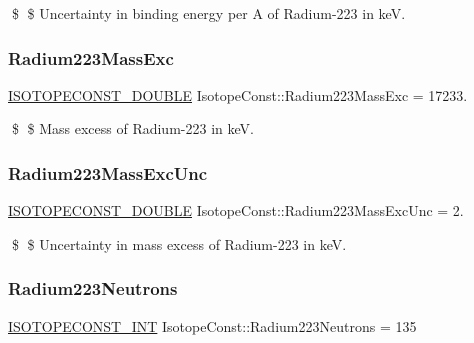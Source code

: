 \$ \$ Uncertainty in binding energy per A of Radium-\/223 in keV. \mbox{\label{group___isotope_const-_radium-_ra223_ga9c9695cea644dc98fabcd31b0465de1b}} 
\subsubsection{\texorpdfstring{Radium223\+Mass\+Exc}{Radium223MassExc}}
{\footnotesize\ttfamily \mbox{\hyperlink{group___isotope_const-_macros_ga8f45a7272ce02c0b4c65c44636ed719a}{I\+S\+O\+T\+O\+P\+E\+C\+O\+N\+S\+T\+\_\+\+D\+O\+U\+B\+LE}} Isotope\+Const\+::\+Radium223\+Mass\+Exc = 17233.}

\$ \$ Mass excess of Radium-\/223 in keV. \mbox{\label{group___isotope_const-_radium-_ra223_ga3b6c33d3b3476078f94186088eb22dcc}} 
\subsubsection{\texorpdfstring{Radium223\+Mass\+Exc\+Unc}{Radium223MassExcUnc}}
{\footnotesize\ttfamily \mbox{\hyperlink{group___isotope_const-_macros_ga8f45a7272ce02c0b4c65c44636ed719a}{I\+S\+O\+T\+O\+P\+E\+C\+O\+N\+S\+T\+\_\+\+D\+O\+U\+B\+LE}} Isotope\+Const\+::\+Radium223\+Mass\+Exc\+Unc = 2.}

\$ \$ Uncertainty in mass excess of Radium-\/223 in keV. \mbox{\label{group___isotope_const-_radium-_ra223_ga8dd10df71a4eebe7e19e72f0cf3d2bc7}} 
\subsubsection{\texorpdfstring{Radium223\+Neutrons}{Radium223Neutrons}}
{\footnotesize\ttfamily \mbox{\hyperlink{group___isotope_const-_macros_ga5f18360b3e99483a35c32d789e62621c}{I\+S\+O\+T\+O\+P\+E\+C\+O\+N\+S\+T\+\_\+\+I\+NT}} Isotope\+Const\+::\+Radium223\+Neutrons = 135}

